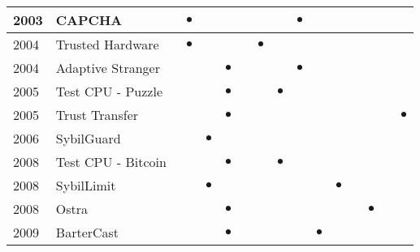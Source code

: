 \begin{table*}[]
\begin{tabular}{||l||l||c|c|c||c|c|c|c|c|c|c|c|c|c||}
  2003 & CAPCHA~\cite{von2003captcha}                         & $\bullet$ &           &           &           &           &           & $\bullet$ &           &           &           &           &           &           \\ \hline
  2004 & Trusted Hardware~\cite{newsome2004sybil}             & $\bullet$ &           &           &           & $\bullet$ &           &           &           &           &           &           &           &           \\ \hline
  2004 & Adaptive Stranger~\cite{feldman2004robust}           &           &           & $\bullet$ &           &           &           & $\bullet$ &           &           &           &           &           &           \\ \hline
  2005 & Test CPU - Puzzle~\cite{aspnes2005exposing}          &           &           & $\bullet$ &           &           & $\bullet$ &           &           &           &           &           &           &           \\ \hline
  2005 & Trust Transfer~\cite{seigneur2005trust}              &           &           & $\bullet$ &           &           &           &           &           &           &           &           &           & $\bullet$ \\ \hline
  2006 & SybilGuard~\cite{yu2006sybilguard}                   &           & $\bullet$ &           &           &           &           &           &           &           &           &           &           &           \\ \hline
  2008 & Test CPU - Bitcoin~\cite{nakamoto2008bitcoin}        &           &           & $\bullet$ &           &           & $\bullet$ &           &           &           &           &           &           &           \\ \hline
  2008 & SybilLimit~\cite{yu2008sybillimit}                   &           & $\bullet$ &           &           &           &           &           &           & $\bullet$ &           &           &           &           \\ \hline
  2008 & Ostra~\cite{mislove2008ostra}                        &           &           & $\bullet$ &           &           &           &           &           &           &           & $\bullet$ &           &           \\ \hline
  2009 & BarterCast~\cite{meulpolder2009bartercast}           &           &           & $\bullet$ &           &           &           &           & $\bullet$ &           &           &           &           &           \\ \hline

\end{tabular}
\end{table*}
